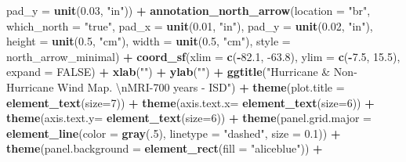\documentclass[12pt,oneside]{reedthesis}
\newenvironment{Shaded}{\begin{snugshade}}{\end{snugshade}}
\newcommand{\CharTok}[1]{\textcolor[rgb]{0.31,0.60,0.02}{#1}}
\newcommand{\DataTypeTok}[1]{\textcolor[rgb]{0.13,0.29,0.53}{#1}}
\newcommand{\DecValTok}[1]{\textcolor[rgb]{0.00,0.00,0.81}{#1}}
\newcommand{\FloatTok}[1]{\textcolor[rgb]{0.00,0.00,0.81}{#1}}
\newcommand{\KeywordTok}[1]{\textcolor[rgb]{0.13,0.29,0.53}{\textbf{#1}}}
\newcommand{\NormalTok}[1]{#1}
\newcommand{\OperatorTok}[1]{\textcolor[rgb]{0.81,0.36,0.00}{\textbf{#1}}}
\newcommand{\OtherTok}[1]{\textcolor[rgb]{0.56,0.35,0.01}{#1}}
\newcommand{\StringTok}[1]{\textcolor[rgb]{0.31,0.60,0.02}{#1}}
\begin{document}
\begin{Shaded}
\begin{Highlighting}[]
   \DataTypeTok{pad_y =} \KeywordTok{unit}\NormalTok{(}\FloatTok{0.03}\NormalTok{, }\StringTok{"in"}\NormalTok{)) }\OperatorTok{+}\StringTok{ }
\StringTok{  }\KeywordTok{annotation_north_arrow}\NormalTok{(}\DataTypeTok{location =} \StringTok{"br"}\NormalTok{, }\DataTypeTok{which_north =} \StringTok{"true"}\NormalTok{, }\DataTypeTok{pad_x =} \KeywordTok{unit}\NormalTok{(}\FloatTok{0.01}\NormalTok{, }\StringTok{"in"}\NormalTok{), }\DataTypeTok{pad_y =} \KeywordTok{unit}\NormalTok{(}\FloatTok{0.02}\NormalTok{, }\StringTok{"in"}\NormalTok{), }\DataTypeTok{height =} \KeywordTok{unit}\NormalTok{(}\FloatTok{0.5}\NormalTok{, }\StringTok{"cm"}\NormalTok{), }
   \DataTypeTok{width =} \KeywordTok{unit}\NormalTok{(}\FloatTok{0.5}\NormalTok{, }\StringTok{"cm"}\NormalTok{), }\DataTypeTok{style =}\NormalTok{ north_arrow_minimal) }\OperatorTok{+}
\StringTok{  }\KeywordTok{coord_sf}\NormalTok{(}\DataTypeTok{xlim =} \KeywordTok{c}\NormalTok{(}\OperatorTok{-}\FloatTok{82.1}\NormalTok{, }\FloatTok{-63.8}\NormalTok{), }\DataTypeTok{ylim =} \KeywordTok{c}\NormalTok{(}\OperatorTok{-}\FloatTok{7.5}\NormalTok{, }\FloatTok{15.5}\NormalTok{), }\DataTypeTok{expand =} \OtherTok{FALSE}\NormalTok{) }\OperatorTok{+}
\StringTok{  }\KeywordTok{xlab}\NormalTok{(}\StringTok{""}\NormalTok{) }\OperatorTok{+}\StringTok{ }
\StringTok{  }\KeywordTok{ylab}\NormalTok{(}\StringTok{""}\NormalTok{) }\OperatorTok{+}\StringTok{ }
\StringTok{  }\KeywordTok{ggtitle}\NormalTok{(}\StringTok{"Hurricane & Non-Hurricane Wind Map. }\CharTok{\textbackslash{}n}\StringTok{MRI-700 years - ISD"}\NormalTok{) }\OperatorTok{+}\StringTok{ }
\StringTok{  }\KeywordTok{theme}\NormalTok{(}\DataTypeTok{plot.title =} \KeywordTok{element_text}\NormalTok{(}\DataTypeTok{size=}\DecValTok{7}\NormalTok{)) }\OperatorTok{+}
\StringTok{  }\KeywordTok{theme}\NormalTok{(}\DataTypeTok{axis.text.x=} \KeywordTok{element_text}\NormalTok{(}\DataTypeTok{size=}\DecValTok{6}\NormalTok{)) }\OperatorTok{+}\StringTok{ }
\StringTok{  }\KeywordTok{theme}\NormalTok{(}\DataTypeTok{axis.text.y=} \KeywordTok{element_text}\NormalTok{(}\DataTypeTok{size=}\DecValTok{6}\NormalTok{)) }\OperatorTok{+}
\StringTok{  }\KeywordTok{theme}\NormalTok{(}\DataTypeTok{panel.grid.major =} \KeywordTok{element_line}\NormalTok{(}\DataTypeTok{color =} \KeywordTok{gray}\NormalTok{(.}\DecValTok{5}\NormalTok{), }\DataTypeTok{linetype =} \StringTok{"dashed"}\NormalTok{, }\DataTypeTok{size =} \FloatTok{0.1}\NormalTok{)) }\OperatorTok{+}
\StringTok{  }\KeywordTok{theme}\NormalTok{(}\DataTypeTok{panel.background =} \KeywordTok{element_rect}\NormalTok{(}\DataTypeTok{fill =} \StringTok{"aliceblue"}\NormalTok{)) }\OperatorTok{+}

\end{Highlighting}
\end{Shaded}
\end{document}
